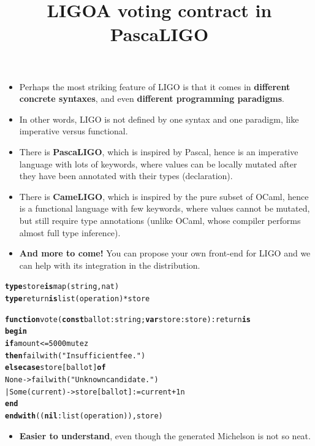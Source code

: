 \documentclass[wide]{slides}
\begin{document}
\begin{slide}
  \title{LIGO}

  \begin{itemize}

    \item Perhaps the most striking feature of LIGO is that it comes
      in \textbf{different concrete syntaxes}, and even
      \textbf{different programming paradigms}.

    \item In other words, LIGO is not defined by one syntax and one
      paradigm, like imperative versus functional.

    \item There is \textbf{PascaLIGO}, which is inspired by Pascal,
      hence is an imperative language with lots of keywords, where
      values can be locally mutated after they have been annotated
      with their types (declaration).

    \item There is \textbf{CameLIGO}, which is inspired by the pure
      subset of OCaml, hence is a functional language with few
      keywords, where values cannot be mutated, but still require type
      annotations (unlike OCaml, whose compiler performs almost full
      type inference).

    \item \textbf{And more to come!} You can propose your own
      front-end for LIGO and we can help with its integration in the
      distribution.

  \end{itemize}

\end{slide}

\begin{slide}
  \title{A voting contract in PascaLIGO}

  \begin{alltt}
\textbf{type} store \textbf{is} map (string, nat)
\textbf{type} return  \textbf{is} list (operation) * store

\textbf{function} vote (\textbf{const} ballot : string; \textbf{var} store : store) : return \textbf{is}
  \textbf{begin}
    \textbf{if}   amount <= 5000mutez
    \textbf{then} failwith ("Insufficient fee.")
    \textbf{else case} store[ballot] \textbf{of}
                         None -> failwith ("Unknown candidate.")
          | Some (current) -> store[ballot] := current + 1n
          \textbf{end}
  \textbf{end with} ((\textbf{nil} : list (operation)), store)
  \end{alltt}

  \begin{itemize}

    \item \textbf{Easier to understand}, even though the generated
      Michelson is not so neat.

  \end{itemize}

\end{slide}
\end{document}
